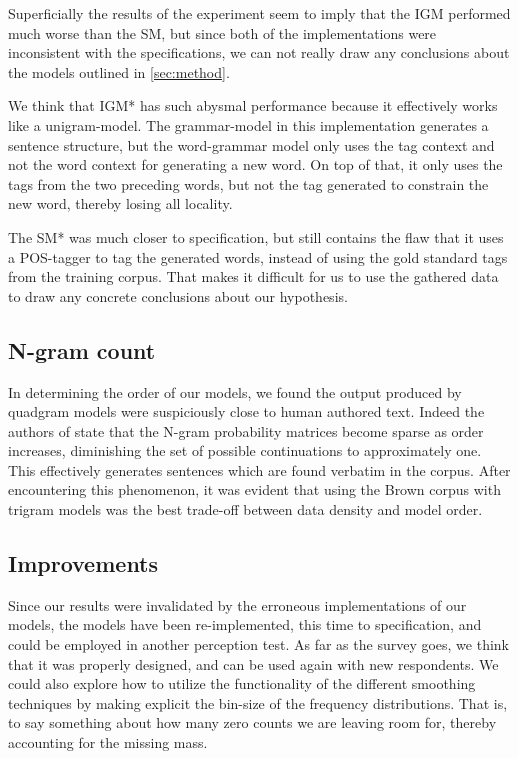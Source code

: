 \documentclass[ai15_group61_report.tex]{subfiles}
\begin{document}
Superficially the results of the experiment seem to imply that the IGM performed much worse than the SM, but since both of the implementations were inconsistent with the specifications, we can not really draw any conclusions about the models outlined in \ref{sec:method}.

We think that IGM* has such abysmal performance because it effectively works like a unigram-model. The grammar-model in this implementation generates a sentence structure, but the word-grammar model only uses the tag context and not the word context for generating a new word. On top of that, it only uses the tags from the two preceding words, but not the tag generated to constrain the new word, thereby losing all locality.

The SM* was much closer to specification, but still contains the flaw that it uses a POS-tagger to tag the generated words, instead of using the gold standard tags from the training corpus. That makes it difficult for us to use the gathered data to draw any concrete conclusions about our hypothesis. 


\subsection{N-gram count}
In determining the order of our models, we found the output produced by quadgram models were suspiciously close to human authored text. Indeed the authors of \cite{Jurafsky2000} state that the N-gram probability matrices become sparse as order increases, diminishing the set of possible continuations to approximately one. This effectively generates sentences which are found verbatim in the corpus. After encountering this phenomenon, it was evident that using the Brown corpus with trigram models was the best trade-off between data density and model order.  

\subsection{Improvements}
Since our results were invalidated by the erroneous implementations of our models, the models have been re-implemented, this time to specification, and could be employed in another perception test. As far as the survey goes, we think that it was properly designed, and can be used again with new respondents. We could also explore how to utilize the functionality of the different smoothing techniques by making explicit the bin-size of the frequency distributions. That is, to say something about how many zero counts we are leaving room for, thereby accounting for the missing mass.
\end{document}
